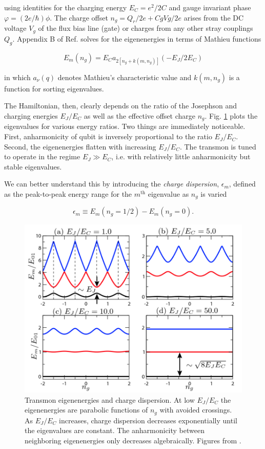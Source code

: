 \documentclass[11 pt, oneside]{book} %
\begin{document}
using identities for the charging energy $E_C=e^2/2C$ and gauge invariant phase $\varphi=(2e/\hbar)\phi$. The charge offset $n_g=Q_r/2e+CgVg/2e$ arises from the DC voltage $V_g$ of the flux bias line (gate) or charges from any other stray couplings $Q_g$. Appendix B of Ref. \cite{Koch}  solves for the eigenenergies in terms of Mathieu functions

\begin{equation}
E_m(n_g)=E_C a_{2[n_g+k(m,n_g)]}(-E_J/2E_C)
\end{equation}

in which $a_\nu(q)$ denotes Mathieu's characteristic value and $k(m, n_g)$ is a function for sorting eigenvalues. 


The Hamiltonian, then, clearly depends on the ratio of the Josephson and charging energies $E_J/E_C$ as well as the effective offset charge $n_g$. Fig. \ref{fig:KochEigenenergies} plots the eigenvalues for various energy ratios. Two things are immediately noticeable. First, anharmonicity of qubit is inversely proportional to the ratio $E_J/E_C$. Second, the eigenenergies flatten with increasing $E_J/E_C$. The transmon is tuned to operate in the regime $E_J\gg E_C$, i.e. with relatively little anharmonicity but stable eigenvalues. 

We can better understand this by introducing the \emph{charge dispersion}, $\epsilon_m$, defined as the peak-to-peak energy range for the $m^{\mathrm{th}}$ eigenvalue as $n_g$ is varied

\begin{equation}\label{eq:ChargeDispersion}
\epsilon_m \equiv E_m(n_g=1/2)-E_m(n_g=0).
\end{equation}

\begin{figure}[h] 
   \centering
   \includegraphics[width=5in]{Koch-Transmon-eigenenergies.png} 
   \caption[Transmon eigenenergies and charge dispersion]{Transmon eigenenergies and charge dispersion. At low $E_J/E_C$ the eigenenergies are parabolic functions of $n_g$ with avoided crossings. As $E_J/E_C$ increases, charge dispersion decreases exponentially until the eigenvalues are constant. The anharmonicity between neighboring eigenenergies only decreases algebraically. Figures from \cite{Koch}.}
   \label{fig:KochEigenenergies}
\end{figure}
\end{document}
